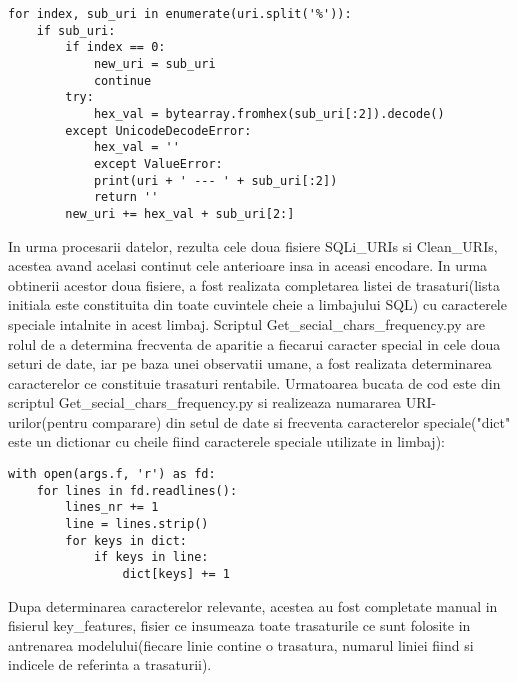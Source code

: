 \lstset{language=python,frame=single, showstringspaces=false}
\begin{lstlisting}
for index, sub_uri in enumerate(uri.split('%')):
    if sub_uri:
        if index == 0:
            new_uri = sub_uri
            continue
        try:
            hex_val = bytearray.fromhex(sub_uri[:2]).decode()
        except UnicodeDecodeError:
            hex_val = ''
            except ValueError:
            print(uri + ' --- ' + sub_uri[:2])
            return ''
        new_uri += hex_val + sub_uri[2:]
\end{lstlisting}

In urma procesarii datelor, rezulta cele doua fisiere SQLi\_URIs si Clean\_URIs, acestea avand acelasi continut cele anterioare insa in aceasi encodare. In urma obtinerii acestor doua fisiere, a fost realizata completarea listei de trasaturi(lista initiala este constituita din toate cuvintele cheie a limbajului SQL) cu caracterele speciale intalnite in acest limbaj. Scriptul Get\_secial\_chars\_frequency.py are rolul de a determina frecventa de aparitie a fiecarui caracter special in cele doua seturi de date, iar pe baza unei observatii umane, a fost realizata determinarea caracterelor ce constituie trasaturi rentabile. Urmatoarea bucata de cod este din scriptul Get\_secial\_chars\_frequency.py si realizeaza numararea URI-urilor(pentru comparare) din setul de date si frecventa caracterelor speciale("dict" este un dictionar cu cheile fiind caracterele speciale utilizate in limbaj):
\lstset{language=python,frame=single, showstringspaces=false}
\begin{lstlisting}
with open(args.f, 'r') as fd:
    for lines in fd.readlines():
        lines_nr += 1
        line = lines.strip()
        for keys in dict:
            if keys in line:
                dict[keys] += 1
\end{lstlisting}
Dupa determinarea caracterelor relevante, acestea au fost completate manual in fisierul key\_features, fisier ce insumeaza toate trasaturile ce sunt folosite in antrenarea modelului(fiecare linie contine o trasatura, numarul liniei fiind si indicele de referinta a trasaturii).

